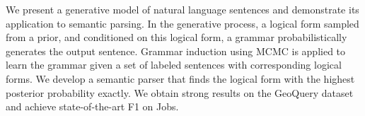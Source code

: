 We present a generative model of natural language sentences and demonstrate its application to semantic parsing. In the generative process, a logical form sampled from a prior, and conditioned on this logical form, a grammar probabilistically generates the output sentence. Grammar induction using MCMC is applied to learn the grammar given a set of labeled sentences with corresponding logical forms. We develop a semantic parser that finds the logical form with the highest posterior probability exactly. We obtain strong results on the GeoQuery dataset and achieve state-of-the-art F1 on Jobs.
